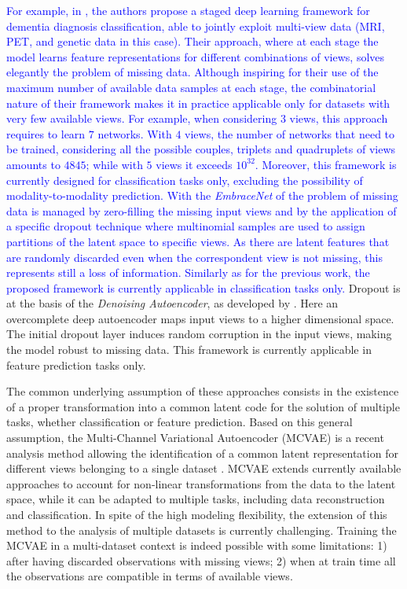 \textcolor{blue}{
	For example, in \cite{Zhou2019a}, the authors propose a staged deep learning framework for dementia diagnosis classification,
	able to jointly exploit multi-view data (MRI, PET, and genetic data in this case).
	Their approach, where at each stage the model learns feature representations for different combinations of views, solves elegantly the problem of missing data.
	Although inspiring for their use of the maximum number of available data samples at each stage,
	the combinatorial nature of their framework makes it in practice applicable only for datasets with very few available views.
	For example, when considering $3$ views, this approach requires to learn $7$ networks.
	With $4$ views, the number of networks that need to be trained, considering all the possible couples, triplets and quadruplets of views amounts to $4845$;
	while with $5$ views it exceeds $10^{32}$.
	Moreover, this framework is currently designed for classification tasks only, excluding the possibility of modality-to-modality prediction.
}
\textcolor{blue}{
	With the \textit{EmbraceNet} of \cite{embracenet} the problem of missing data is managed by zero-filling the missing input views and by the application of a specific dropout technique where multinomial samples are used to assign partitions of the latent space to specific views.
	As there are latent features that are randomly discarded even when the correspondent view is not missing, this represents still a loss of information.
	Similarly as for the previous work, the proposed framework is currently applicable in classification tasks only.
}
Dropout is at the basis of the \textit{Denoising Autoencoder}, as developed by \cite{dae}.
Here an overcomplete deep autoencoder maps input views to a higher dimensional space.
The initial dropout layer induces random corruption in the input views, making the model robust to missing data.
This framework is currently applicable in feature prediction tasks only.

The common underlying assumption of these approaches consists in the existence of a
proper transformation into a common latent code for the solution of multiple tasks,
whether classification or feature prediction.
%
Based on this general assumption,
the Multi-Channel Variational Autoencoder (MCVAE) \citep{Antelmi2019}
is a recent  analysis method allowing the identification of a common latent representation for different views belonging to a single dataset .
MCVAE extends currently available approaches to account for non-linear transformations from the data to the latent space,
while it can be adapted to multiple tasks, including data reconstruction and classification.
In spite of the high modeling flexibility, the extension of this method to the analysis of multiple datasets is currently challenging.
Training the MCVAE in a multi-dataset context is indeed possible with some limitations:
1) after having discarded observations with missing views;
2) when at train time all the observations are compatible in terms of available views.

